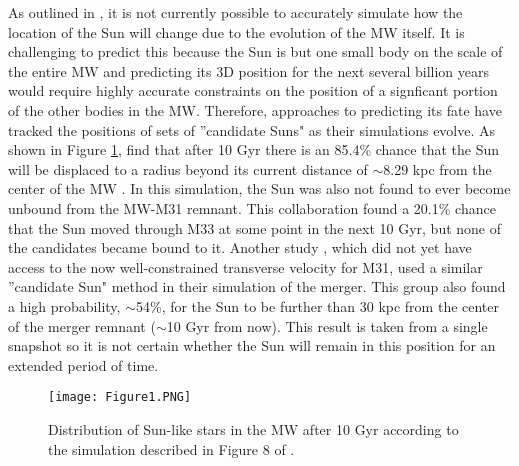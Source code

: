 \documentclass{aastex63}
\begin{document}
As outlined in \cite{2012ApJ...753....9V}, it is not currently possible to accurately simulate how the location of the Sun will change due to the evolution of the MW itself. It is challenging to predict this because the Sun is but one small body on the scale of the entire MW and predicting its 3D position for the next several billion years would require highly accurate constraints on the position of a signficant portion of the other bodies in the MW. Therefore, approaches to predicting its fate have tracked the positions of sets of ''candidate Suns" as their simulations evolve. As shown in Figure \ref{fig:histogram}, \cite{2012ApJ...753....9V} find that after 10 Gyr there is an 85.4\% chance that the Sun will be displaced to a radius beyond its current distance of $\sim$8.29 kpc from the center of the MW . In this simulation, the Sun was also not found to ever become unbound from the MW-M31 remnant. This collaboration found a 20.1\% chance that the Sun moved through M33 at some point in the next 10 Gyr, but none of the candidates became bound to it. Another study \citep{2008MNRAS.386..461C}, which did not yet have access to the now well-constrained transverse velocity for M31, used a similar ''candidate Sun" method in their simulation of the merger. This group also found a high probability, $\sim$54\%, for the Sun to be further than 30 kpc from the center of the merger remnant ($\sim$10 Gyr from now). This result is taken from a single snapshot so it is not certain whether the Sun will remain in this position for an extended period of time.

\begin{figure}
    \centering
    \texttt{[image: Figure1.PNG]}
    \caption{Distribution of Sun-like stars in the MW after 10 Gyr according to the simulation described in Figure 8 of \cite{2012ApJ...753....9V}.}
    \label{fig:histogram}
\end{figure}
\end{document}
